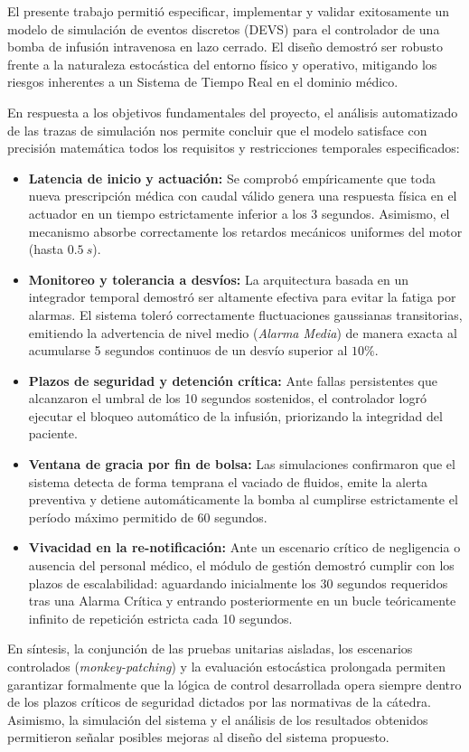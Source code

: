 El presente trabajo permitió especificar, implementar y validar exitosamente un modelo de simulación de eventos discretos (DEVS) para el controlador de una bomba de infusión intravenosa en lazo cerrado. El diseño demostró ser robusto frente a la naturaleza estocástica del entorno físico y operativo, mitigando los riesgos inherentes a un Sistema de Tiempo Real en el dominio médico.

En respuesta a los objetivos fundamentales del proyecto, el análisis automatizado de las trazas de simulación nos permite concluir que el modelo satisface con precisión matemática todos los requisitos y restricciones temporales especificados:

\begin{itemize}
    \item \textbf{Latencia de inicio y actuación:} Se comprobó empíricamente que toda nueva prescripción médica con caudal válido genera una respuesta física en el actuador en un tiempo estrictamente inferior a los 3 segundos. Asimismo, el mecanismo absorbe correctamente los retardos mecánicos uniformes del motor (hasta $0.5~s$).
    
    \item \textbf{Monitoreo y tolerancia a desvíos:} La arquitectura basada en un integrador temporal demostró ser altamente efectiva para evitar la fatiga por alarmas. El sistema toleró correctamente fluctuaciones gaussianas transitorias, emitiendo la advertencia de nivel medio (\textit{Alarma Media}) de manera exacta al acumularse 5 segundos continuos de un desvío superior al $10\%$.
    
    \item \textbf{Plazos de seguridad y detención crítica:} Ante fallas persistentes que alcanzaron el umbral de los 10 segundos sostenidos, el controlador logró ejecutar el bloqueo automático de la infusión, priorizando la integridad del paciente.
    
    \item \textbf{Ventana de gracia por fin de bolsa:} Las simulaciones confirmaron que el sistema detecta de forma temprana el vaciado de fluidos, emite la alerta preventiva y detiene automáticamente la bomba al cumplirse estrictamente el período máximo permitido de 60 segundos.
    
    \item \textbf{Vivacidad en la re-notificación:} Ante un escenario crítico de negligencia o ausencia del personal médico, el módulo de gestión demostró cumplir con los plazos de escalabilidad: aguardando inicialmente los 30 segundos requeridos tras una Alarma Crítica y entrando posteriormente en un bucle teóricamente infinito de repetición estricta cada 10 segundos.
\end{itemize}

En síntesis, la conjunción de las pruebas unitarias aisladas, los escenarios controlados (\textit{monkey-patching}) y la evaluación estocástica prolongada permiten garantizar formalmente que la lógica de control desarrollada opera siempre dentro de los plazos críticos de seguridad dictados por las normativas de la cátedra. Asimismo, la simulación del sistema y el análisis de los resultados obtenidos permitieron señalar posibles mejoras al diseño del sistema propuesto.
